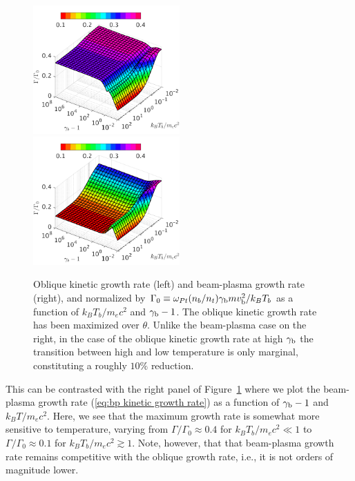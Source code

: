 \documentclass[usenatbib,iop,apj,numberedappendix]{aeb_emulateapj_2015}
\newcommand{\gammabeam}{\ensuremath{\gamma_{\rm b}}}
\newcommand{\vbeam}{\ensuremath{v_{\rm b}}}
\begin{document}
\begin{figure}
\includegraphics[width=0.5\textwidth]{pp2.pdf}
\includegraphics[width=0.5\textwidth]{pp3.pdf}

\caption{Oblique kinetic growth rate (left) and beam-plasma growth rate (right),
  and normalized by
  $\Gamma_0\equiv\omega_{Pt}(n_b/n_t)\gammabeam m \vbeam^2/k_BT_b$ as a function of
  $k_BT_b/m_ec^2$ and $\gammabeam-1$.  The oblique kinetic growth rate has been maximized over $\theta$. Unlike the beam-plasma case on the right, in the case of the
    oblique kinetic growth rate at high $\gammabeam$ the transition between high
    and low temperature is only marginal, constituting a roughly $10\%$
    reduction. } \label{fig:OGgen}
\end{figure}

This can be contrasted with the right panel of
  Figure~\ref{fig:OGgen} where we plot the beam-plasma growth rate
(\ref{eq:bp kinetic growth rate}) as a function of $\gammabeam - 1$ and $k_B
T/m_ec^2$.  Here, we see that the maximum growth rate is somewhat more
sensitive to temperature, varying from $\Gamma/\Gamma_0 \approx 0.4$ for
$k_BT_b/m_ec^2 \ll 1$ to $\Gamma/\Gamma_0 \approx 0.1$ for $k_BT_b/m_ec^2 \gtrsim
1$.  Note, however, that that beam-plasma growth rate remains competitive with
the oblique growth rate, i.e., it is not orders of magnitude lower.
\end{document}
